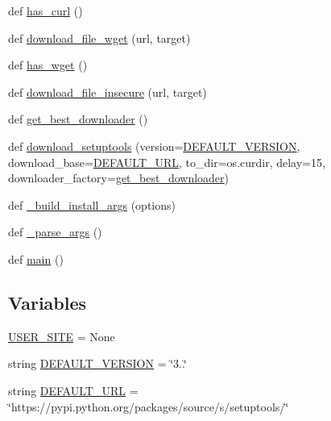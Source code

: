 \begin{DoxyCompactItemize}
def \hyperlink{namespaceez__setup_a4377c05e875ddaef521db5db8d5d97d8}{has\+\_\+curl} ()
\item 
def \hyperlink{namespaceez__setup_af87aff324e74dd596c88cbbb05bdc0a0}{download\+\_\+file\+\_\+wget} (url, target)
\item 
def \hyperlink{namespaceez__setup_acc4250f7e8576ec6578b5dfcabe09d43}{has\+\_\+wget} ()
\item 
def \hyperlink{namespaceez__setup_a77f73fd049bccd9c8b10f5be6ef16ed1}{download\+\_\+file\+\_\+insecure} (url, target)
\item 
def \hyperlink{namespaceez__setup_a37c9e523f99cd7b5cfd01eada43de9ad}{get\+\_\+best\+\_\+downloader} ()
\item 
def \hyperlink{namespaceez__setup_ad41db6464296e12f487740425f92091d}{download\+\_\+setuptools} (version=\hyperlink{namespaceez__setup_aa031ee965f5310beedcd57236385d518}{D\+E\+F\+A\+U\+L\+T\+\_\+\+V\+E\+R\+S\+I\+ON}, download\+\_\+base=\hyperlink{namespaceez__setup_a8096341ad5ff1c048779efc8668fe864}{D\+E\+F\+A\+U\+L\+T\+\_\+\+U\+RL}, to\+\_\+dir=os.\+curdir, delay=15, downloader\+\_\+factory=\hyperlink{namespaceez__setup_a37c9e523f99cd7b5cfd01eada43de9ad}{get\+\_\+best\+\_\+downloader})
\item 
def \hyperlink{namespaceez__setup_a64abeb67b326053d9ba41f66c52858cc}{\+\_\+build\+\_\+install\+\_\+args} (options)
\item 
def \hyperlink{namespaceez__setup_a8f215e2844706ec1c7ff6295f91cc0b1}{\+\_\+parse\+\_\+args} ()
\item 
def \hyperlink{namespaceez__setup_abc81dbe1d4caae0b1729c17a6914882e}{main} ()
\end{DoxyCompactItemize}
\subsection*{Variables}
\begin{DoxyCompactItemize}
\item 
\hyperlink{namespaceez__setup_a7d83143a1fe0b349410ca451d3306eb8}{U\+S\+E\+R\+\_\+\+S\+I\+TE} = None
\item 
string \hyperlink{namespaceez__setup_aa031ee965f5310beedcd57236385d518}{D\+E\+F\+A\+U\+L\+T\+\_\+\+V\+E\+R\+S\+I\+ON} = \char`\"{}3..\char`\"{}
\item 
string \hyperlink{namespaceez__setup_a8096341ad5ff1c048779efc8668fe864}{D\+E\+F\+A\+U\+L\+T\+\_\+\+U\+RL} = \char`\"{}https\+://pypi.\+python.\+org/packages/source/s/setuptools/\char`\"{}
\end{DoxyCompactItemize}


